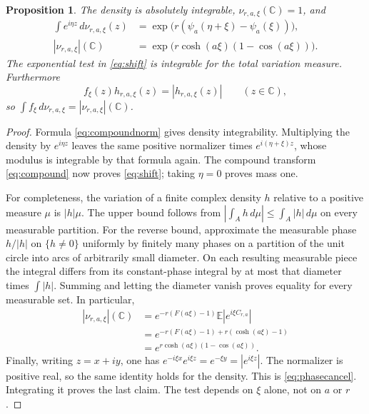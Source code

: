 \documentclass[11pt]{article}
\newtheorem{proposition}[theorem]{Proposition}
\newcommand{\C}{\mathbb C}\newcommand{\R}{\mathbb R}
\newcommand{\E}{\mathbb E}\newcommand{\Pp}{\mathbb P}
\begin{document}
\begin{proposition}\label{prop:finite}
The density is absolutely integrable, $\nu_{r,a,\xi}(\C)=1$, and
\begin{align}
 \int e^{i\eta z}\,d\nu_{r,a,\xi}(z)
 &=\exp\bigl(r(\psi_a(\eta+\xi)-\psi_a(\xi))\bigr),\label{eq:shift}\\
 |\nu_{r,a,\xi}|(\C)
 &=\exp\bigl(r\cosh(a\xi)(1-\cos(a\xi))\bigr).
 \label{eq:variation}
\end{align}
The exponential test in \eqref{eq:shift} is integrable for the total
variation measure. Furthermore
\begin{equation}\label{eq:phasecancel}
 f_\xi(z)h_{r,a,\xi}(z)=|h_{r,a,\xi}(z)|\qquad(z\in\C),
\end{equation}
so $\int f_\xi\,d\nu_{r,a,\xi}=|\nu_{r,a,\xi}|(\C)$.
\end{proposition}
\begin{proof}
Formula \eqref{eq:compoundnorm} gives density integrability. Multiplying
the density by $e^{i\eta z}$ leaves the same positive normalizer times
$e^{i(\eta+\xi)z}$, whose modulus is integrable by that formula again.
The compound transform \eqref{eq:compound} now proves
\eqref{eq:shift}; taking $\eta=0$ proves mass one.

For completeness, the variation of a finite complex density $h$ relative
to a positive measure $\mu$ is $|h|\mu$. The upper bound follows from
$|\int_A h\,d\mu|\leq\int_A|h|\,d\mu$ on every measurable partition.
For the reverse bound, approximate the measurable phase $h/|h|$ on
$\{h\ne0\}$ uniformly by finitely many phases on a partition of the
unit circle into arcs of arbitrarily small diameter. On each resulting
measurable piece the integral differs from its constant-phase integral
by at most that diameter times $\int|h|$. Summing and letting the diameter
vanish proves equality for every measurable set. In particular,
\begin{align*}
 |\nu_{r,a,\xi}|(\C)
 &=e^{-r(F(a\xi)-1)}\E|e^{i\xi C_{r,a}}|\\
 &=e^{-r(F(a\xi)-1)+r(\cosh(a\xi)-1)}\\
 &=e^{r\cosh(a\xi)(1-\cos(a\xi))}.
\end{align*}
Finally, writing $z=x+iy$, one has
$e^{-i\xi x}e^{i\xi z}=e^{-\xi y}=|e^{i\xi z}|$.
The normalizer is positive real, so the same identity holds for the
density. This is \eqref{eq:phasecancel}. Integrating it proves the last
claim. The test depends on $\xi$ alone, not on $a$ or $r$.
\end{proof}
\end{document}
